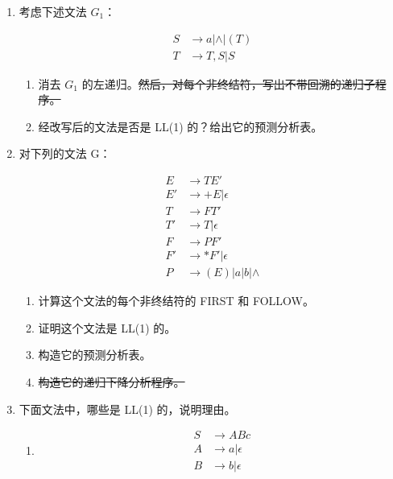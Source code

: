 \begin{enumerate}
    \item 考虑下述文法 $G_1$：
    
    \begin{align*}
        S & \to a | \wedge | (T) \\
        T & \to T,S | S
    \end{align*}
    
    \begin{enumerate}
        \item 消去 $G_1$ 的左递归。\sout{然后，对每个非终结符，写出不带回溯的递归子程序。}
        \item 经改写后的文法是否是 LL(1) 的？给出它的预测分析表。
        
    \end{enumerate}
    
    \item 对下列的文法 G：
    
    \begin{align*}
        E & \to TE' \\
        E' & \to +E | \epsilon \\
        T & \to FT' \\
        T' & \to T | \epsilon \\
        F & \to PF' \\
        F' & \to *F' | \epsilon \\
        P & \to (E) | a | b | \wedge
    \end{align*}
    
    \begin{enumerate}
        \item 计算这个文法的每个非终结符的 FIRST 和 FOLLOW。
        \item 证明这个文法是 LL(1) 的。
        \item 构造它的预测分析表。
        \item \sout{构造它的递归下降分析程序。}
    \end{enumerate}
    
    \item 下面文法中，哪些是 LL(1) 的，说明理由。
    
    \begin{enumerate}
        \item \begin{align*}
            S & \to ABc \\
            A & \to a | \epsilon \\
            B & \to b | \epsilon
        \end{align*}
        

\end{enumerate}
\end{enumerate}
